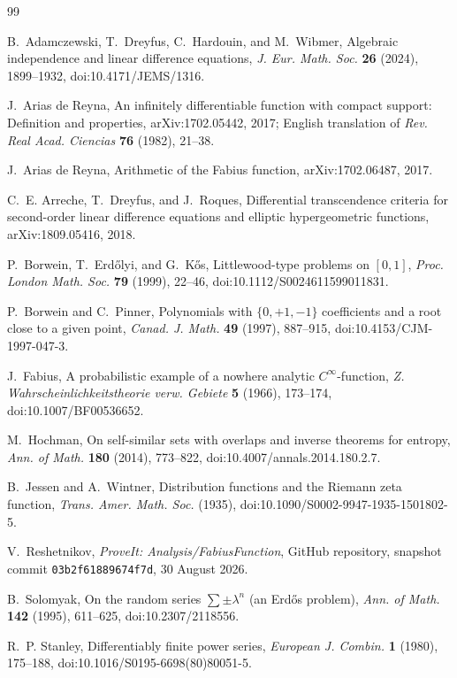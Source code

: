 \documentclass[11pt]{article}
\numberwithin{equation}{section}
\theoremstyle{definition}
\theoremstyle{remark}
\begin{document}
\begin{thebibliography}{99}

B.~Adamczewski, T.~Dreyfus, C.~Hardouin, and M.~Wibmer,
\newblock Algebraic independence and linear difference equations,
\newblock \emph{J. Eur. Math. Soc.} \textbf{26} (2024), 1899--1932,
\newblock doi:10.4171/JEMS/1316.

J.~Arias de Reyna,
\newblock An infinitely differentiable function with compact support:
Definition and properties,
\newblock arXiv:1702.05442, 2017; English translation of
\emph{Rev. Real Acad. Ciencias} \textbf{76} (1982), 21--38.

J.~Arias de Reyna,
\newblock Arithmetic of the Fabius function,
\newblock arXiv:1702.06487, 2017.

C.~E. Arreche, T.~Dreyfus, and J.~Roques,
\newblock Differential transcendence criteria for second-order linear
difference equations and elliptic hypergeometric functions,
\newblock arXiv:1809.05416, 2018.

P.~Borwein, T.~Erd\H{o}lyi, and G.~K\H{o}s,
\newblock Littlewood-type problems on $[0,1]$,
\newblock \emph{Proc. London Math. Soc.} \textbf{79} (1999), 22--46,
\newblock doi:10.1112/S0024611599011831.

P.~Borwein and C.~Pinner,
\newblock Polynomials with $\{0,+1,-1\}$ coefficients and a root close to a
given point,
\newblock \emph{Canad. J. Math.} \textbf{49} (1997), 887--915,
\newblock doi:10.4153/CJM-1997-047-3.

J.~Fabius,
\newblock A probabilistic example of a nowhere analytic $C^\infty$-function,
\newblock \emph{Z. Wahrscheinlichkeitstheorie verw. Gebiete}
\textbf{5} (1966), 173--174,
\newblock doi:10.1007/BF00536652.

M.~Hochman,
\newblock On self-similar sets with overlaps and inverse theorems for entropy,
\newblock \emph{Ann. of Math.} \textbf{180} (2014), 773--822,
\newblock doi:10.4007/annals.2014.180.2.7.

B.~Jessen and A.~Wintner,
\newblock Distribution functions and the Riemann zeta function,
\newblock \emph{Trans. Amer. Math. Soc.} (1935),
\newblock doi:10.1090/S0002-9947-1935-1501802-5.

V.~Reshetnikov,
\newblock \emph{ProveIt: Analysis/FabiusFunction},
\newblock GitHub repository, snapshot commit \texttt{03b2f61889674f7d}, 30 August 2026.

B.~Solomyak,
\newblock On the random series $\sum\pm\lambda^n$ (an Erd\H{o}s problem),
\newblock \emph{Ann. of Math.} \textbf{142} (1995), 611--625,
\newblock doi:10.2307/2118556.

R.~P. Stanley,
\newblock Differentiably finite power series,
\newblock \emph{European J. Combin.} \textbf{1} (1980), 175--188,
\newblock doi:10.1016/S0195-6698(80)80051-5.

\end{thebibliography}
\end{document}
